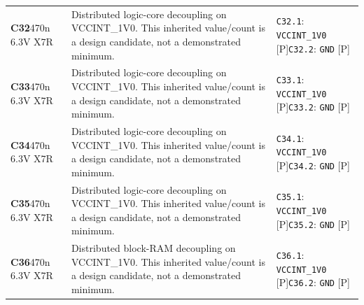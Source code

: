 \documentclass[11pt,a4paper]{article}
\begin{document}
\begin{longtable}{@{}P{27mm}P{83mm}P{58mm}@{}}
\textbf{C32}\newline 470n 6.3V X7R & Distributed logic-core decoupling on VCCINT\_1V0. This inherited value/count is a design candidate, not a demonstrated minimum. & \nolinkurl{C32.1}: \nolinkurl{VCCINT_1V0} [P]\newline \nolinkurl{C32.2}: \nolinkurl{GND} [P] \\
\textbf{C33}\newline 470n 6.3V X7R & Distributed logic-core decoupling on VCCINT\_1V0. This inherited value/count is a design candidate, not a demonstrated minimum. & \nolinkurl{C33.1}: \nolinkurl{VCCINT_1V0} [P]\newline \nolinkurl{C33.2}: \nolinkurl{GND} [P] \\
\textbf{C34}\newline 470n 6.3V X7R & Distributed logic-core decoupling on VCCINT\_1V0. This inherited value/count is a design candidate, not a demonstrated minimum. & \nolinkurl{C34.1}: \nolinkurl{VCCINT_1V0} [P]\newline \nolinkurl{C34.2}: \nolinkurl{GND} [P] \\
\textbf{C35}\newline 470n 6.3V X7R & Distributed logic-core decoupling on VCCINT\_1V0. This inherited value/count is a design candidate, not a demonstrated minimum. & \nolinkurl{C35.1}: \nolinkurl{VCCINT_1V0} [P]\newline \nolinkurl{C35.2}: \nolinkurl{GND} [P] \\
\textbf{C36}\newline 470n 6.3V X7R & Distributed block-RAM decoupling on VCCINT\_1V0. This inherited value/count is a design candidate, not a demonstrated minimum. & \nolinkurl{C36.1}: \nolinkurl{VCCINT_1V0} [P]\newline \nolinkurl{C36.2}: \nolinkurl{GND} [P] \\

\end{longtable}
\end{document}
